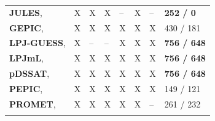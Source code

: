 \documentclass[gmdd]{copernicus} %
\begin{document}
\begin{table}[ht]
\begin{tabular}{p{6cm} p{1cm} p{1cm} p{1cm} p{1cm} p{1cm} p{1cm} p{1.9cm}}
        \textbf{JULES},     \citet{Osborne2015, Williams2015, Williams2017} & X & X & X & -- & X & -- & \textbf{252 / 0}\\ \middlehline
        \textbf{GEPIC},     \citet{LIU2007478, FOLBERTH201221} & X & X & X & X & X & X & 430 / 181\\ \middlehline
        \textbf{LPJ-GUESS}, \citet{Lindeskog2013, Olin2015}    & X & -- & -- & X & X & X & \textbf{756 / 648}\\  \middlehline
        \textbf{LPJmL},     \citet{von_Bloh_implementing_2018} & X & X & X & X & X & X & \textbf{756 / 648}\\ \middlehline
        \textbf{pDSSAT},    \citet{Elliott2014b, JONES2003235} & X & X & X & X & X & X & \textbf{756 / 648}\\ \middlehline
        \textbf{PEPIC},     \citet{LIU2016164, LIU2016}        & X & X & X & X & X & X & 149 / 121\\ \middlehline
        \textbf{PROMET},    \citet{Hank2015, MAUSER2015, Zabel2019}  & X & X & X & X & X & -- & 261 / 232\\
        \bottomhline
    \end{tabular}
\end{table}
\end{document}
